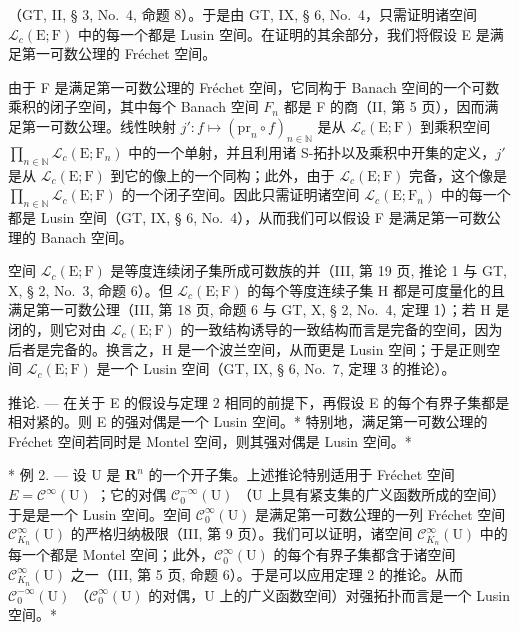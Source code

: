 （GT, II, § 3, No.~4, 命题 8）。于是由 GT, IX, § 6, No.~4，只需证明诸空间 \(\mathcal{L}_c(\mathrm{E};\mathrm{F})\) 中的每一个都是 Lusin 空间。在证明的其余部分，我们将假设 E 是满足第一可数公理的 Fréchet 空间。

由于 F 是满足第一可数公理的 Fréchet 空间，它同构于 Banach 空间的一个可数乘积的闭子空间，其中每个 Banach 空间 \(F_{n}\) 都是 F 的商（II, 第 5 页），因而满足第一可数公理。线性映射 \(j': f \mapsto (\mathrm{pr}_{n} \circ f)_{n \in \mathbb{N}}\) 是从 \(\mathcal{L}_{c}(\mathrm{E}; \mathrm{F})\) 到乘积空间 \(\prod_{n \in \mathbb{N}} \mathcal{L}_{c}(\mathrm{E}; \mathrm{F}_{n})\) 中的一个单射，并且利用诸 S-拓扑以及乘积中开集的定义，\(j'\) 是从 \(\mathcal{L}_{c}(\mathrm{E}; \mathrm{F})\) 到它的像上的一个同构；此外，由于 \(\mathcal{L}_{c}(\mathrm{E}; \mathrm{F})\) 完备，这个像是 \(\prod_{n \in \mathbb{N}} \mathcal{L}_{c}(\mathrm{E}; \mathrm{F})\) 的一个闭子空间。因此只需证明诸空间 \(\mathcal{L}_{c}(\mathrm{E}; \mathrm{F}_{n})\) 中的每一个都是 Lusin 空间（GT, IX, § 6, No.~4），从而我们可以假设 F 是满足第一可数公理的 Banach 空间。

空间 \(\mathcal{L}_{c}(\mathrm{E};\mathrm{F})\) 是等度连续闭子集所成可数族的并（III, 第 19 页, 推论 1 与 GT, X, § 2, No.~3, 命题 6）。但 \(\mathcal{L}_{c}(\mathrm{E};\mathrm{F})\) 的每个等度连续子集 H 都是可度量化的且满足第一可数公理（III, 第 18 页, 命题 6 与 GT, X, § 2, No.~4, 定理 1）；若 H 是闭的，则它对由 \(\mathcal{L}_{c}(\mathrm{E};\mathrm{F})\) 的一致结构诱导的一致结构而言是完备的空间，因为后者是完备的。换言之，H 是一个波兰空间，从而更是 Lusin 空间；于是正则空间 \(\mathcal{L}_{c}(\mathrm{E};\mathrm{F})\) 是一个 Lusin 空间（GT, IX, § 6, No.~7, 定理 3 的推论）。

推论. --- 在关于 E 的假设与定理 2 相同的前提下，再假设 E 的每个有界子集都是相对紧的。则 E 的强对偶是一个 Lusin 空间。* 特别地，满足第一可数公理的 Fréchet 空间若同时是 Montel 空间，则其强对偶是 Lusin 空间。*

* 例 2. --- 设 U 是 \(\mathbf{R}^{n}\) 的一个开子集。上述推论特别适用于 Fréchet 空间 \(E = \mathcal{C}^{\infty}(\mathrm{U})\) ；它的对偶 \(\mathcal{C}_{0}^{-\infty}(\mathrm{U})\) （U 上具有紧支集的广义函数所成的空间）于是是一个 Lusin 空间。空间 \(\mathcal{C}_{0}^{\infty}(\mathrm{U})\) 是满足第一可数公理的一列 Fréchet 空间 \(\mathcal{C}_{K_n}^{\infty}(\mathrm{U})\) 的严格归纳极限（III, 第 9 页）。我们可以证明，诸空间 \(\mathcal{C}_{K_n}^{\infty}(\mathrm{U})\) 中的每一个都是 Montel 空间；此外，\(\mathcal{C}_{0}^{\infty}(\mathrm{U})\) 的每个有界子集都含于诸空间 \(\mathcal{C}_{K_n}^{\infty}(\mathrm{U})\) 之一（III, 第 5 页, 命题 6）。于是可以应用定理 2 的推论。从而 \(\mathcal{C}_{0}^{-\infty}(\mathrm{U})\) （\(\mathcal{C}_{0}^{\infty}(\mathrm{U})\) 的对偶，U 上的广义函数空间）对强拓扑而言是一个 Lusin 空间。*

